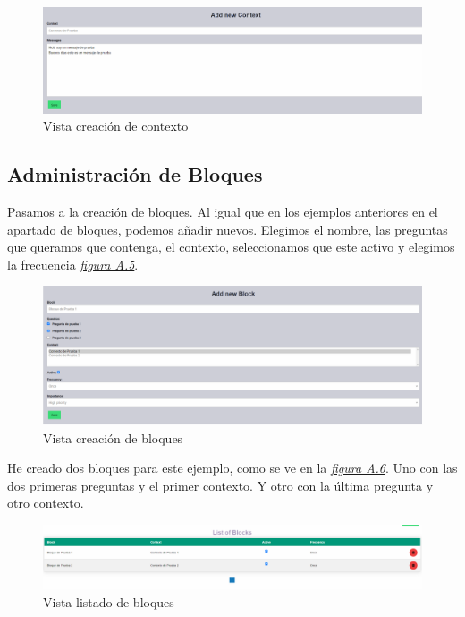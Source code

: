 \begin{figure}[!ht]
    \centering
    \includegraphics[width=1\textwidth]{imagenes/add_context_a.png}
    \caption{ Vista creación de contexto }
    \label{fig:creacion-contexto}
\end{figure}

\subsection{Administración de Bloques}

Pasamos a la creación de bloques. Al igual que en los ejemplos anteriores en el apartado de bloques, podemos añadir nuevos. Elegimos el nombre, las preguntas que queramos que contenga, el contexto, seleccionamos que este activo y elegimos la frecuencia \textit{\hyperref[fig:creacion-bloques]{figura A.5}}. 

\begin{figure}[!ht]
    \centering
    \includegraphics[width=1\textwidth]{imagenes/add_bloque_a1.png}
    \caption{ Vista creación de bloques }
    \label{fig:creacion-bloques}
\end{figure}\vspace{0.5cm}

He creado dos bloques para este ejemplo, como se ve en la \textit{\hyperref[fig:contextos-creados]{figura A.6}}. Uno con las dos primeras preguntas y el primer contexto. Y otro con la última pregunta y otro contexto.  

\begin{figure}[!ht]
    \centering
    \includegraphics[width=1\textwidth]{imagenes/list_bloques_a.png}
    \caption{ Vista listado de bloques }
    \label{fig:creacion_contexto}
\end{figure}



